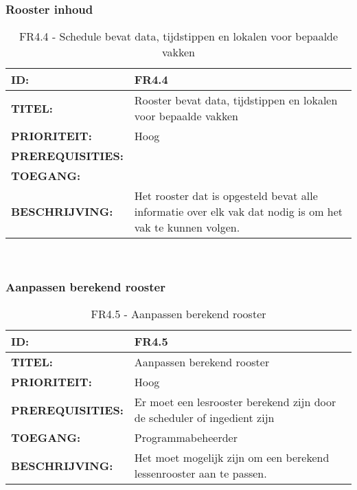 \subsubsection{Rooster inhoud}        
\noindent\begin{table}[H]
	\begin{tabular}{l | p{10cm}}
	\textbf{ID:} & FR4.4 \\ \hline
	\textbf{TITEL:} & Rooster bevat data, tijdstippen en lokalen voor bepaalde vakken\\ \hline
	\textbf{PRIORITEIT:} &  Hoog \\ \hline
	\textbf{PREREQUISITIES:} & \\ \hline
	\textbf{TOEGANG:} &  \\ \hline
	\textbf{BESCHRIJVING:} & Het rooster dat is opgesteld bevat alle informatie over elk vak dat nodig is om het vak te kunnen volgen.\\
	\end{tabular}\\
	\caption{FR4.4 - Schedule bevat data, tijdstippen en lokalen voor bepaalde vakken}
	\label{tab:FR4.4 - Schedule bevat data, tijdstippen en lokalen voor bepaalde vakken}
\end{table}
       
\subsubsection{Aanpassen berekend rooster}         
\noindent\begin{table}[H]
            \begin{tabular}{l | p{10cm}}
                \textbf{ID:} & FR4.5 \\ \hline
                \textbf{TITEL:} & Aanpassen berekend rooster \\ \hline
                \textbf{PRIORITEIT:} &  Hoog \\ \hline
                \textbf{PREREQUISITIES:} & Er moet een lesrooster berekend zijn door de scheduler of ingedient zijn\\ \hline
                \textbf{TOEGANG:} & Programmabeheerder \\ \hline
                \textbf{BESCHRIJVING:} & Het moet mogelijk zijn om een berekend lessenrooster aan te passen.\\
            \end{tabular}\\
            \caption{FR4.5 - Aanpassen berekend rooster}
            \label{tab:FR4.5 - Aanpassen berekend rooster}
        \end{table}
        
